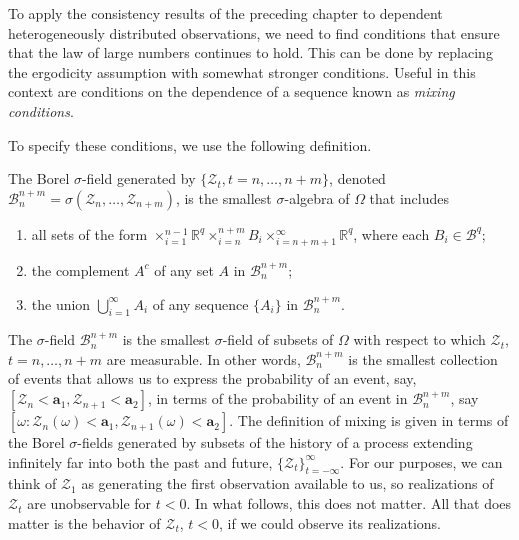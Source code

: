To apply the consistency results of the preceding chapter to dependent heterogeneously distributed observations, we need to find conditions that ensure that the law of large numbers continues to hold. This can be done by replacing the ergodicity assumption with somewhat stronger conditions. Useful in this context are conditions on the dependence of a sequence known as \emph{mixing conditions}.

To specify these conditions, we use the following definition.

\begin{definition}\label{def:sigma-field-generated}
The Borel $\sigma$-field generated by $\{\boldsymbol{\mathcal{Z}}_t, t = n, \ldots, n+m\}$, denoted $\mathcal{B}_n^{n+m} = \sigma(\boldsymbol{\mathcal{Z}}_n, \ldots, \boldsymbol{\mathcal{Z}}_{n+m})$, is the smallest $\sigma$-algebra of $\Omega$ that includes
\begin{enumerate}[label=(\roman*)]
\item all sets of the form $\times_{i=1}^{n-1} \mathbb{R}^q \times_{i=n}^{n+m} B_i \times_{i=n+m+1}^{\infty} \mathbb{R}^q$, where each $B_i \in \mathcal{B}^q$;
\item the complement $A^c$ of any set $A$ in $\mathcal{B}_n^{n+m}$;
\item the union $\bigcup_{i=1}^{\infty} A_i$ of any sequence $\{A_i\}$ in $\mathcal{B}_n^{n+m}$.
\end{enumerate}
\end{definition}

The $\sigma$-field $\mathcal{B}_n^{n+m}$ is the smallest $\sigma$-field of subsets of $\Omega$ with respect to which $\boldsymbol{\mathcal{Z}}_t$, $t = n, \ldots, n+m$ are measurable. In other words, $\mathcal{B}_n^{n+m}$ is the smallest collection of events that allows us to express the probability of an event, say, $[\boldsymbol{\mathcal{Z}}_n < \mathbf{a}_1, \boldsymbol{\mathcal{Z}}_{n+1} < \mathbf{a}_2]$, in terms of the probability of an event in $\mathcal{B}_n^{n+m}$, say $[\omega : \boldsymbol{\mathcal{Z}}_n(\omega) < \mathbf{a}_1, \boldsymbol{\mathcal{Z}}_{n+1}(\omega) < \mathbf{a}_2]$. The definition of mixing is given in terms of the Borel $\sigma$-fields generated by subsets of the history of a process extending infinitely far into both the past and future, $\{\boldsymbol{\mathcal{Z}}_t\}_{t=-\infty}^{\infty}$. For our purposes, we can think of $\boldsymbol{\mathcal{Z}}_1$ as generating the first observation available to us, so realizations of $\boldsymbol{\mathcal{Z}}_t$ are unobservable for $t < 0$. In what follows, this does not matter. All that does matter is the behavior of $\boldsymbol{\mathcal{Z}}_t$, $t < 0$, if we could observe its realizations.

